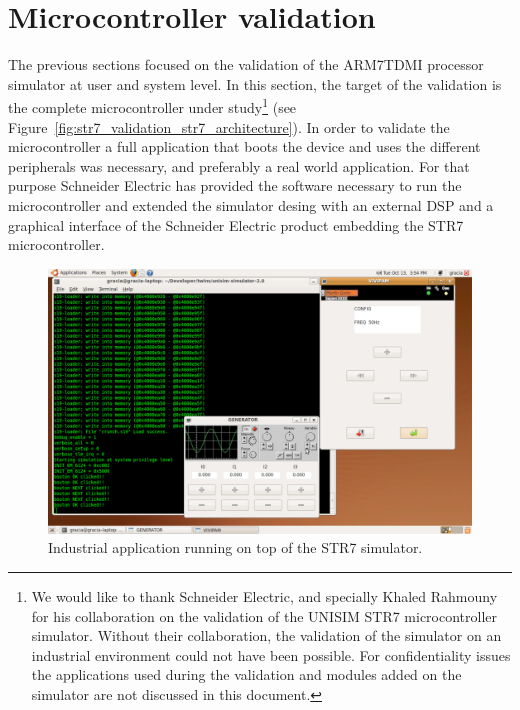 \section{Microcontroller validation}
\label{sec:str7_validation_microcontroller_validation}

The previous sections focused on the validation of the ARM7TDMI processor simulator at user and system level.
In this section, the target of the validation is the complete microcontroller under study\footnote{We would like to thank Schneider Electric, and specially Khaled Rahmouny for his collaboration on the validation of the UNISIM STR7 microcontroller simulator. Without their collaboration, the validation of the simulator on an industrial environment could not have been possible. For confidentiality issues the applications used during the validation and modules added on the simulator are not discussed in this document.} (see Figure~\ref{fig:str7_validation_str7_architecture}).
In order to validate the microcontroller a full application that boots the device and uses the different peripherals was necessary, and preferably a real world application.
For that purpose Schneider Electric has provided the software necessary to run the microcontroller and extended the simulator desing with an external DSP and a graphical interface of the Schneider Electric product embedding the STR7 microcontroller.

\begin{figure}[!h]
	\begin{center}
		\includegraphics[width=\textwidth]{str7_validation/figures/industrial.pdf}
	\end{center}
	\caption{Industrial application running on top of the STR7 simulator.}
	\label{fig:str7_validation_industrial_application}
\end{figure}


